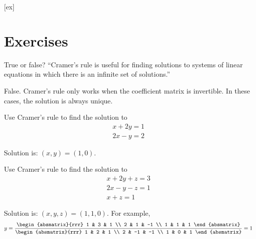 [ex]
\section*{Exercises}


\begin{ex}
  True or false? ``Cramer's rule is useful for finding solutions
    to systems of linear equations in which there is an infinite set
    of solutions.''
  \begin{sol}
    False. Cramer's rule only works when the coefficient matrix is
    invertible. In these cases, the solution is always unique.
  \end{sol}
\end{ex}

\begin{ex}
  Use Cramer's rule to find the solution to
  \begin{equation*}
    \begin{array}{c}
      x+2y=1 \\
      2x-y=2
    \end{array}
  \end{equation*}
  \begin{sol}
    Solution is: $(x,y) = (1,0)$.
  \end{sol}
\end{ex}

\begin{ex}
  Use Cramer's rule to find the solution to
  \begin{equation*}
    \begin{array}{c}
      x+2y+z=3 \\
      2x-y-z=1 \\
      x+z=1
    \end{array}
  \end{equation*}
  \begin{sol}
    Solution is: $(x,y,z) = (1,1,0)$. For example,
    \begin{equation*}
      y=\frac{\begin{absmatrix}{rrr}
          1 & 3 & 1 \\
          2 & 1 & -1 \\
          1 & 1 & 1
        \end{absmatrix}}{\begin{absmatrix}{rrr}
          1 & 2 & 1 \\
          2 & -1 & -1 \\
          1 & 0 & 1
        \end{absmatrix}}=1
    \end{equation*}
  \end{sol}
\end{ex}

